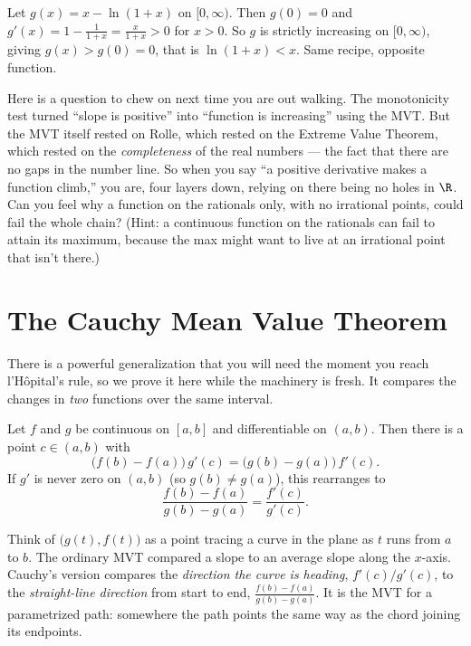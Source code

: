\begin{example}[$\ln(1+x)<x$ for $x>0$]\label{ch15:ex-log-ineq}
Let $g(x)=x-\ln(1+x)$ on $[0,\infty)$. Then $g(0)=0$ and
$g'(x)=1-\frac{1}{1+x}=\frac{x}{1+x}>0$ for $x>0$. So $g$ is strictly increasing on
$[0,\infty)$, giving $g(x)>g(0)=0$, that is $\ln(1+x)<x$. Same recipe, opposite
function.
\end{example}

\begin{walkbox}
Here is a question to chew on next time you are out walking. The monotonicity test
turned ``slope is positive'' into ``function is increasing'' using the MVT. But the
MVT itself rested on Rolle, which rested on the Extreme Value Theorem, which rested
on the \emph{completeness} of the real numbers --- the fact that there are no gaps in
the number line. So when you say ``a positive derivative makes a function climb,''
you are, four layers down, relying on there being no holes in $\R$. Can you feel why
a function on the rationals only, with no irrational points, could fail the whole
chain? (Hint: a continuous function on the rationals can fail to attain its
maximum, because the max might want to live at an irrational point that isn't
there.)
\end{walkbox}

\section{The Cauchy Mean Value Theorem}

There is a powerful generalization that you will need the moment you reach
l'H\^opital's rule, so we prove it here while the machinery is fresh. It compares the
changes in \emph{two} functions over the same interval.

\begin{theorem}\label{ch15:thm-cauchy}
Let $f$ and $g$ be continuous on $[a,b]$ and differentiable on $(a,b)$. Then there
is a point $c\in(a,b)$ with
\[
  \bigl(f(b)-f(a)\bigr)\,g'(c)=\bigl(g(b)-g(a)\bigr)\,f'(c).
\]
If $g'$ is never zero on $(a,b)$ (so $g(b)\ne g(a)$), this rearranges to
\[
  \frac{f(b)-f(a)}{g(b)-g(a)}=\frac{f'(c)}{g'(c)}.
\]
\end{theorem}

\begin{intuitionbox}
Think of $\bigl(g(t),f(t)\bigr)$ as a point tracing a curve in the plane as $t$ runs
from $a$ to $b$. The ordinary MVT compared a slope to an average slope along the
$x$-axis. Cauchy's version compares the \emph{direction the curve is heading},
$f'(c)/g'(c)$, to the \emph{straight-line direction} from start to end,
$\frac{f(b)-f(a)}{g(b)-g(a)}$. It is the MVT for a parametrized path: somewhere the
path points the same way as the chord joining its endpoints.
\end{intuitionbox}

